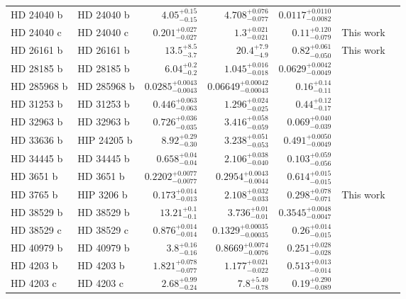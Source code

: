 \begin{longtable*}{llrrrrr}
HD 24040 b & HD 24040 b & $4.05^{+0.15}_{-0.15}$ & $4.708^{+0.076}_{-0.077}$ & $0.0117^{+0.0110}_{-0.0082}$ & \cite{Boisse12} & \\
HD 24040 c & HD 24040 c & $0.201^{+0.027}_{-0.027}$ & $1.3^{+0.021}_{-0.021}$ & $0.11^{+0.120}_{-0.079}$ & This work & \\
HD 26161 b & HD 26161 b & $13.5^{+8.5}_{-3.7}$ & $20.4^{+7.9}_{-4.9}$ & $0.82^{+0.061}_{-0.050}$ & This work & \\
HD 28185 b & HD 28185 b & $6.04^{+0.2}_{-0.2}$ & $1.045^{+0.016}_{-0.018}$ & $0.0629^{+0.0042}_{-0.0049}$ & \cite{Santos01} & \\
HD 285968 b & HD 285968 b & $0.0285^{+0.0043}_{-0.0043}$ & $0.06649^{+0.00042}_{-0.00043}$ & $0.16^{+0.14}_{-0.11}$ & \cite{Forveille09} & \\
HD 31253 b & HD 31253 b & $0.446^{+0.063}_{-0.063}$ & $1.296^{+0.024}_{-0.025}$ & $0.44^{+0.12}_{-0.17}$ & \cite{Meschiari11} & \\
HD 32963 b & HD 32963 b & $0.726^{+0.036}_{-0.035}$ & $3.416^{+0.058}_{-0.059}$ & $0.069^{+0.040}_{-0.039}$ & \cite{Rowan16} & \\
HD 33636 b & HIP 24205 b & $8.92^{+0.29}_{-0.30}$ & $3.238^{+0.051}_{-0.053}$ & $0.491^{+0.0050}_{-0.0049}$ & \cite{Vogt02} & \\
HD 34445 b & HD 34445 b & $0.658^{+0.04}_{-0.04}$ & $2.106^{+0.038}_{-0.040}$ & $0.103^{+0.059}_{-0.056}$ & \cite{Howard10} & \\
HD 3651 b & HD 3651 b & $0.2202^{+0.0077}_{-0.0077}$ & $0.2954^{+0.0043}_{-0.0044}$ & $0.614^{+0.015}_{-0.015}$ & \cite{Fischer03} & \\
HD 3765 b & HIP 3206 b & $0.173^{+0.014}_{-0.013}$ & $2.108^{+0.032}_{-0.033}$ & $0.298^{+0.078}_{-0.071}$ & This work & \\
HD 38529 b & HD 38529 b & $13.21^{+0.1}_{-0.1}$ & $3.736^{+0.01}_{-0.01}$ & $0.3545^{+0.0048}_{-0.0047}$ & \cite{Fischer01} & \\
HD 38529 c & HD 38529 c & $0.876^{+0.014}_{-0.014}$ & $0.1329^{+0.00035}_{-0.00035}$ & $0.26^{+0.014}_{-0.015}$ & \cite{Fischer03} & \\
HD 40979 b & HD 40979 b & $3.8^{+0.16}_{-0.16}$ & $0.8669^{+0.0074}_{-0.0076}$ & $0.251^{+0.028}_{-0.028}$ & \cite{Fischer03} & \\
HD 4203 b & HD 4203 b & $1.821^{+0.078}_{-0.077}$ & $1.177^{+0.021}_{-0.022}$ & $0.513^{+0.013}_{-0.014}$ & \cite{Vogt02} & \\
HD 4203 c & HD 4203 c & $2.68^{+0.99}_{-0.24}$ & $7.8^{+5.40}_{-0.78}$ & $0.19^{+0.290}_{-0.089}$ & \cite{Kane14} & \\

\end{longtable*}

